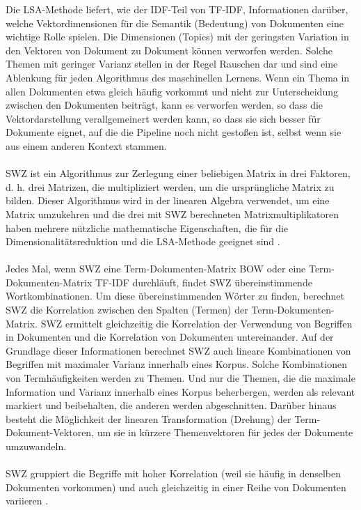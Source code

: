 Die \ac{LSA}-Methode liefert, wie der \ac{IDF}-Teil von \ac{TF-IDF}, Informationen darüber, welche Vektordimensionen für die Semantik (Bedeutung) von Dokumenten eine wichtige Rolle spielen. 
Die Dimensionen (Topics) mit der geringsten Variation in den Vektoren von Dokument zu Dokument können verworfen werden. 
Solche Themen mit geringer Varianz stellen in der Regel Rauschen dar und sind eine Ablenkung für jeden Algorithmus des maschinellen Lernens. 
Wenn ein Thema in allen Dokumenten etwa gleich häufig vorkommt und nicht zur Unterscheidung zwischen den Dokumenten beiträgt, kann es verworfen werden, so dass die Vektordarstellung verallgemeinert werden kann, so dass sie sich besser für Dokumente eignet, auf die die Pipeline noch nicht gestoßen ist, selbst wenn sie aus einem anderen Kontext stammen.\\\\
\ac{SWZ} ist ein Algorithmus zur Zerlegung einer beliebigen Matrix in drei Faktoren, d. h. drei Matrizen, die multipliziert werden, um die ursprüngliche Matrix zu bilden. 
Dieser Algorithmus wird in der linearen Algebra verwendet, um eine Matrix umzukehren und die drei mit \ac{SWZ} berechneten Matrixmultiplikatoren haben mehrere nützliche mathematische Eigenschaften, die für die Dimensionalitätsreduktion und die \ac{LSA}-Methode geeignet sind \cite{eckart_approximation_1936}.\\\\
Jedes Mal, wenn \ac{SWZ} eine Term-Dokumenten-Matrix \ac{BOW} oder eine Term-Dokumenten-Matrix \ac{TF-IDF} durchläuft, findet \ac{SWZ} übereinstimmende Wortkombinationen. 
Um diese übereinstimmenden Wörter zu finden, berechnet \ac{SWZ} die Korrelation zwischen den Spalten (Termen) der Term-Dokumenten-Matrix. 
\ac{SWZ} ermittelt gleichzeitig die Korrelation der Verwendung von Begriffen in Dokumenten und die Korrelation von Dokumenten untereinander. 
Auf der Grundlage dieser Informationen berechnet \ac{SWZ} auch lineare Kombinationen von Begriffen mit maximaler Varianz innerhalb eines Korpus. 
Solche Kombinationen von Termhäufigkeiten werden zu Themen. 
Und nur die Themen, die die maximale Information und Varianz innerhalb eines Korpus beherbergen, werden als relevant markiert und beibehalten, die anderen werden abgeschnitten. 
Darüber hinaus besteht die Möglichkeit der linearen Transformation (Drehung) der Term-Dokument-Vektoren, um sie in kürzere Themenvektoren für jedes der Dokumente umzuwandeln. \cite{wong_generalized_1985}\\\\
\ac{SWZ} gruppiert die Begriffe mit hoher Korrelation (weil sie häufig in denselben Dokumenten vorkommen) und auch gleichzeitig in einer Reihe von Dokumenten variieren \cite{isbell_restructuring_1998}. 
